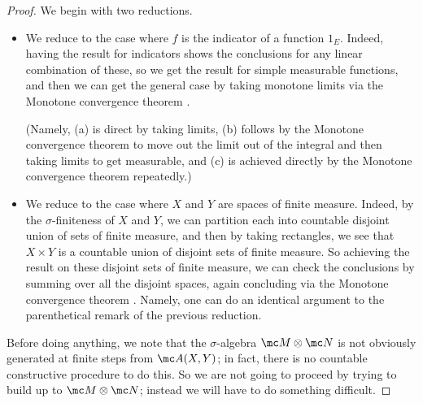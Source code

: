 \documentclass[../notes.tex]{subfiles}
\begin{document}
\begin{proof}
	We begin with two reductions.
	\begin{itemize}
		\item We reduce to the case where $f$ is the indicator of a function $1_E$. Indeed, having the result for indicators shows the conclusions for any linear combination of these, so we get the result for simple measurable functions, and then we can get the general case by taking monotone limits via the Monotone convergence theorem \cite[Theorem~9.18]{elber-top}.
		
		(Namely, (a) is direct by taking limits, (b) follows by the Monotone convergence theorem to move out the limit out of the integral and then taking limits to get measurable, and (c) is achieved directly by the Monotone convergence theorem repeatedly.)

		\item We reduce to the case where $X$ and $Y$ are spaces of finite measure. Indeed, by the $\sigma$-finiteness of $X$ and $Y$, we can partition each into countable disjoint union of sets of finite measure, and then by taking rectangles, we see that $X\times Y$ is a countable union of disjoint sets of finite measure. So achieving the result on these disjoint sets of finite measure, we can check the conclusions by summing over all the disjoint spaces, again concluding via the Monotone convergence theorem \cite[Theorem~9.18]{elber-top}. Namely, one can do an identical argument to the parenthetical remark of the previous reduction.
	\end{itemize}
	Before doing anything, we note that the $\sigma$-algebra $\mc M\otimes\mc N$ is not obviously generated at finite steps from $\mc A(X,Y)$; in fact, there is no countable constructive procedure to do this. So we are not going to proceed by trying to build up to $\mc M\otimes\mc N$; instead we will have to do something difficult.
\end{proof}
\end{document}
